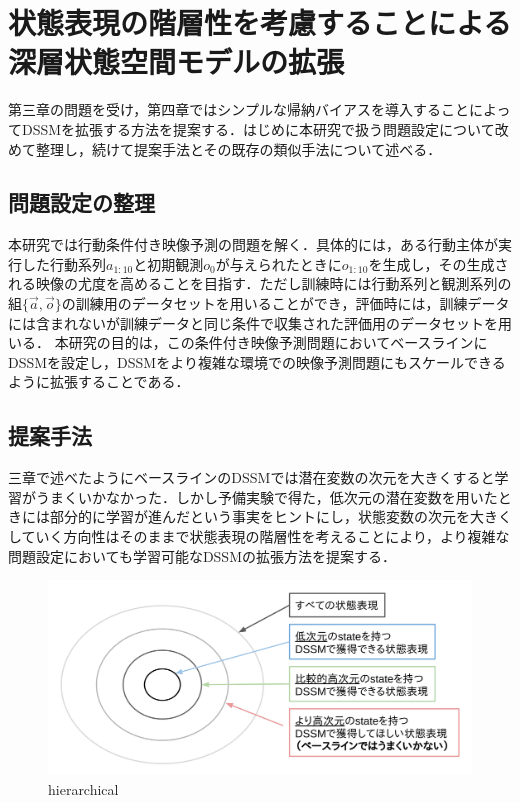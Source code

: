 \chapter{状態表現の階層性を考慮することによる深層状態空間モデルの拡張}
\label{chap:proposal}

第三章の問題を受け，第四章ではシンプルな帰納バイアスを導入することによってDSSMを拡張する方法を提案する．はじめに本研究で扱う問題設定について改めて整理し，続けて提案手法とその既存の類似手法について述べる．

\section{問題設定の整理}

本研究では行動条件付き映像予測の問題を解く．具体的には，ある行動主体が実行した行動系列$a_{1:10}$と初期観測$o_0$が与えられたときに$o_{1:10}$を生成し，その生成される映像の尤度を高めることを目指す．ただし訓練時には行動系列と観測系列の組$\{\vec{a}, \vec{o}\}$の訓練用のデータセットを用いることができ，評価時には，訓練データには含まれないが訓練データと同じ条件で収集された評価用のデータセットを用いる．
本研究の目的は，この条件付き映像予測問題においてベースラインにDSSMを設定し，DSSMをより複雑な環境での映像予測問題にもスケールできるように拡張することである．

\section{提案手法}
三章で述べたようにベースラインのDSSMでは潜在変数の次元を大きくすると学習がうまくいかなかった．しかし予備実験で得た，低次元の潜在変数を用いたときには部分的に学習が進んだという事実をヒントにし，状態変数の次元を大きくしていく方向性はそのままで状態表現の階層性を考えることにより，より複雑な問題設定においても学習可能なDSSMの拡張方法を提案する．

\begin{figure}[tp]
  \begin{center}
    \includegraphics[width=\linewidth]{./figures/hierarchical.png}
    \caption{hierarchical}
    \label{fig:hierarchical}
  \end{center}
\end{figure}

